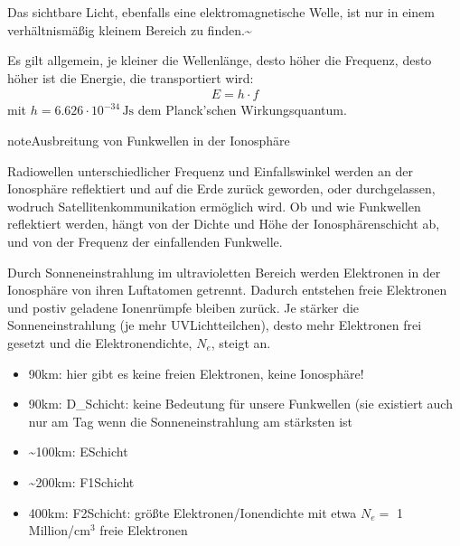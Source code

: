 \documentclass[letterpaper,10pt,english]{jupyterBook}
\begin{document}
\sphinxAtStartPar
Das sichtbare Licht, ebenfalls eine elektromagnetische Welle, ist nur in einem verhältnismäßig kleinem Bereich zu finden.\textasciitilde{}

\sphinxAtStartPar
Es gilt allgemein, je kleiner die Wellenlänge, desto höher die Frequenz, desto höher ist die Energie, die transportiert wird:
\begin{equation*}
\begin{split}E = h \cdot f \end{split}
\end{equation*}
\sphinxAtStartPar
mit \(h = 6.626\cdot 10^{-34}\,\mathrm{Js}\) dem Planck’schen Wirkungsquantum.

\sphinxAtStartPar
{}

\begin{sphinxadmonition}{note}{Ausbreitung von Funkwellen in der Ionosphäre}

\sphinxAtStartPar
Radiowellen unterschiedlicher Frequenz und Einfallswinkel werden an der Ionosphäre reflektiert und auf die Erde zurück geworden, oder durchgelassen, wodruch Satellitenkommunikation ermöglich wird. Ob und wie Funkwellen reflektiert werden, hängt von der Dichte und Höhe der Ionosphärenschicht ab, und von der Frequenz der einfallenden Funkwelle.

\sphinxAtStartPar
Durch Sonneneinstrahlung im ultravioletten Bereich werden Elektronen in der Ionosphäre von ihren Luftatomen getrennt. Dadurch entstehen freie Elektronen und postiv geladene Ionenrümpfe bleiben zurück. Je stärker die Sonneneinstrahlung (je mehr UV\sphinxhyphen{}Lichtteilchen), desto mehr Elektronen frei gesetzt und die Elektronendichte, \(N_e\), steigt an.
\begin{itemize}
\item {} 
\sphinxhyphen{}90km: hier gibt es keine freien Elektronen, keine Ionosphäre!

\item {} 
\sphinxhyphen{}90km: D\_Schicht: keine Bedeutung für unsere Funkwellen (sie existiert auch nur am Tag wenn die Sonneneinstrahlung am stärksten ist

\item {} 
\sphinxAtStartPar
\textasciitilde{}100km: E\sphinxhyphen{}Schicht

\item {} 
\sphinxAtStartPar
\textasciitilde{}200km: F1\sphinxhyphen{}Schicht

\item {} 
\sphinxhyphen{}400km: F2\sphinxhyphen{}Schicht: größte Elektronen\sphinxhyphen{}/Ionendichte mit etwa \(N_e =\) 1 Million/cm\(^3\) freie Elektronen


\end{itemize}
\end{sphinxadmonition}
\end{document}
